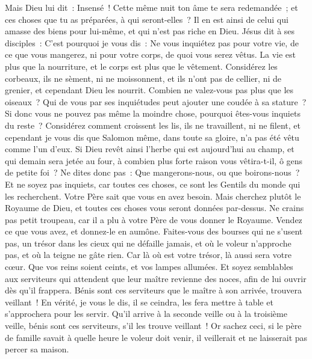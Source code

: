 \begin{multicols}{2}
Mais Dieu lui dit~: Insensé~! Cette même nuit ton âme te sera redemandée~; et ces choses que tu as préparées, à qui seront-elles~?
Il en est ainsi de celui qui amasse des biens pour lui-même, et qui n'est pas riche en Dieu.
Jésus dit à ses disciples~: C'est pourquoi je vous dis~: Ne vous inquiétez pas pour votre vie, de ce que vous mangerez, ni pour votre corps, de quoi vous serez vêtus.
La vie est plus que la nourriture, et le corps est plus que le vêtement.
Considérez les corbeaux, ils ne sèment, ni ne moissonnent, et ils n'ont pas de cellier, ni de grenier, et cependant Dieu les nourrit. Combien ne valez-vous pas plus que les oiseaux~?
Qui de vous par ses inquiétudes peut ajouter une coudée à sa stature~?
Si donc vous ne pouvez pas même la moindre chose, pourquoi êtes-vous inquiets du reste~?
Considérez comment croissent les lis, ils ne travaillent, ni ne filent, et cependant je vous dis que Salomon même, dans toute sa gloire, n'a pas été vêtu comme l'un d'eux.
Si Dieu revêt ainsi l'herbe qui est aujourd'hui au champ, et qui demain sera jetée au four, à combien plus forte raison vous vêtira-t-il, ô gens de petite foi~?
Ne dites donc pas~: Que mangerons-nous, ou que boirons-nous~? Et ne soyez pas inquiets,
car toutes ces choses, ce sont les Gentils du monde qui les recherchent. Votre Père sait que vous en avez besoin.
Mais cherchez plutôt le Royaume de Dieu, et toutes ces choses vous seront données par-dessus.
Ne crains pas petit troupeau, car il a plu à votre Père de vous donner le Royaume.
Vendez ce que vous avez, et donnez-le en aumône. Faites-vous des bourses qui ne s'usent pas, un trésor dans les cieux qui ne défaille jamais, et où le voleur n'approche pas, et où la teigne ne gâte rien.
Car là où est votre trésor, là aussi sera votre cœur.
Que vos reins soient ceints, et vos lampes allumées.
Et soyez semblables aux serviteurs qui attendent que leur maître revienne des noces, afin de lui ouvrir dès qu'il frappera.
Bénis sont ces serviteurs que le maître à son arrivée, trouvera veillant~! En vérité, je vous le dis, il se ceindra, les fera mettre à table et s'approchera pour les servir.
Qu'il arrive à la seconde veille ou à la troisième veille, bénis sont ces serviteurs, s'il les trouve veillant~!
Or sachez ceci, si le père de famille savait à quelle heure le voleur doit venir, il veillerait et ne laisserait pas percer sa maison.

\end{multicols}
